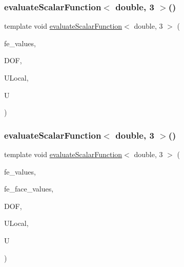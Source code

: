 \mbox{\label{function_evaluations_8cc_acf0861a6c93d4385e4738cd36457969d}} 
\subsubsection{\texorpdfstring{evaluate\+Scalar\+Function$<$ double, 3 $>$()}{evaluateScalarFunction< double, 3 >()}\hspace{0.1cm}{\footnotesize\ttfamily [1/2]}}
{\footnotesize\ttfamily template void \mbox{\hyperlink{group___evaluation_functions_ga2e2fbeb2173113c6889c73bbb7304789}{evaluate\+Scalar\+Function}}$<$ double, 3 $>$ (\begin{DoxyParamCaption}\item[{const F\+E\+Values$<$ 3 $>$ \&}]{fe\+\_\+values,  }\item[{unsigned int}]{D\+OF,  }\item[{Table$<$ 1, double $>$ \&}]{U\+Local,  }\item[{Table$<$ 1, double $>$ \&}]{U }\end{DoxyParamCaption})}

\mbox{\label{function_evaluations_8cc_ab0361b7dabb7d8e4edf83632ddb3129c}} 
\subsubsection{\texorpdfstring{evaluate\+Scalar\+Function$<$ double, 3 $>$()}{evaluateScalarFunction< double, 3 >()}\hspace{0.1cm}{\footnotesize\ttfamily [2/2]}}
{\footnotesize\ttfamily template void \mbox{\hyperlink{group___evaluation_functions_ga2e2fbeb2173113c6889c73bbb7304789}{evaluate\+Scalar\+Function}}$<$ double, 3 $>$ (\begin{DoxyParamCaption}\item[{const F\+E\+Values$<$ 3 $>$ \&}]{fe\+\_\+values,  }\item[{const F\+E\+Face\+Values$<$ 3 $>$ \&}]{fe\+\_\+face\+\_\+values,  }\item[{unsigned int}]{D\+OF,  }\item[{Table$<$ 1, double $>$ \&}]{U\+Local,  }\item[{Table$<$ 1, double $>$ \&}]{U }\end{DoxyParamCaption})}


